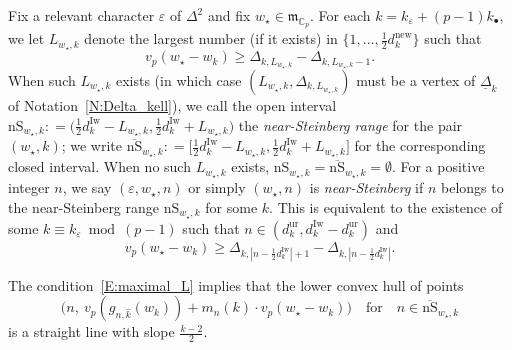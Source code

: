 \begin{definition}
    \label{D:near_steinberg}
    Fix a relevant character $\varepsilon$ of $\Delta^2$ and fix $w_\star \in {\mathfrak{m}}_{{\mathbb{C}}_p}$. For each $k=k_\varepsilon + (p-1)k_\bullet$, we let $L_{w_\star,k}$ denote the largest number (if it exists) in $\{1, \dots, \frac 12 d_{k}^{\mathrm{new}}\}$ such that
    \begin{equation}
    \label{E:maximal_L}
    v_p(w_\star - w_k) \geq  \Delta_{k,L_{w_\star, k}} - \Delta_{k, L_{w_\star, k}-1}.
    \end{equation}
    When such $L_{w_\star, k}$ exists (in which case $(L_{w_\star, k}, \Delta_{k, L_{w_\star, k}})$ must be a vertex of $\underline \Delta_k$ of Notation~\ref{N:Delta_kell}), we call the open interval ${\mathrm{nS}}_{w_\star, k}: =\big (\frac 12 d_{k}^{\mathrm{Iw}}- L_{w_\star,k}, \frac 12 d_{k}^{\mathrm{Iw}}+ L_{w_\star,k}\big)$ the \emph{near-Steinberg range} for  the pair $(w_\star, k)$; we write $\overline {\mathrm{nS}}_{w_\star, k}: = \big[\frac 12 d_{k}^{\mathrm{Iw}}- L_{w_\star,k}, \frac 12 d_{k}^{\mathrm{Iw}}+ L_{w_\star,k}\big]$ for the corresponding closed interval.
    When no such $L_{w_\star, k}$ exists, ${\mathrm{nS}}_{w_\star, k} = \overline {\mathrm{nS}}_{w_\star, k} = \emptyset$.
    For a positive integer $n$, we say $(\varepsilon, w_\star, n)$ or simply $(w_\star, n)$ is \emph{near-Steinberg} if $n$ belongs to the near-Steinberg range ${\mathrm{nS}}_{w_\star, k}$ for some $k$. This is equivalent to the existence of some $k \equiv  k_\varepsilon \bmod{(p-1)}$ such that $n \in (d_{k}^{\mathrm{ur}}, d_{k}^{\mathrm{Iw}}- d_{k}^{\mathrm{ur}})$ and
    $$
    v_p(w_\star - w_k) \geq  \Delta_{k, |n-\frac 12 d_k^{{\mathrm{Iw}}}|+1} - \Delta_{k, |n-\frac 12 d_k^{{\mathrm{Iw}}}|}.
    $$
\end{definition}

\begin{lemma}
    \label{L:alternative_characterization_of_Lmax}
    The condition~\eqref{E:maximal_L} implies that the lower convex hull of points
    \begin{equation}
    \label{E:convexity_condition_for_near-Steinberg}
    \big(n, \ v_p(g_{n, \hat k}(w_k)) + m_n(k) \cdot v_p(w_\star - w_k)\big) \quad \textrm{for} \quad n \in \overline {\mathrm{nS}}_{w_\star, k}
    \end{equation}
    is a straight line with slope $\frac{k-2}2$.
\end{lemma}

